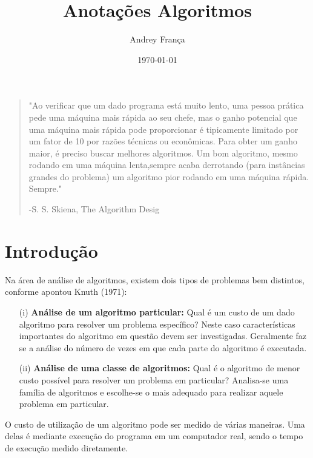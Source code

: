 \documentclass[10pt,a4paper]{article}
\author{Andrey França}
\title{Anotações Algoritmos}
\date{\today}
\begin{document}
\maketitle

\begin{quote}

	"Ao verificar que um dado programa está muito lento, uma pessoa prática pede uma 
	máquina mais rápida ao seu chefe, mas o ganho potencial que uma máquina mais 
	rápida pode proporcionar é tipicamente limitado por um fator de 10 por razões 
	técnicas ou econômicas. Para obter um ganho maior, é preciso buscar melhores 
	algoritmos. Um bom algoritmo, mesmo rodando em uma máquina lenta,sempre acaba 
	derrotando (para instâncias grandes do problema) um algoritmo pior rodando em 
	uma máquina rápida. Sempre."
	
	\begin{flushright}
		-S. S. Skiena, The Algorithm Desig
	\end{flushright}
	
\end{quote}

\section{Introdução}

Na área de análise de algoritmos, existem dois tipos de problemas bem distintos, conforme apontou Knuth (1971):

\begin{itemize}

	\item[(i)] \textbf{Análise de um algoritmo particular:} Qual é um custo de um dado algoritmo
	 para resolver um problema específico? Neste  caso características importantes do
	  algoritmo em questão devem ser investigadas.  Geralmente faz se a análise do 
	  número de vezes em que cada parte do algoritmo é executada.
	  
	 \item[(ii)] \textbf{Análise de uma classe de algoritmos:} Qual é o algoritmo de menor custo
	  possível para resolver um problema em particular? Analisa-se uma família de algoritmos
	   e escolhe-se o mais adequado para realizar aquele problema em particular.
	   
\end{itemize}


O custo de utilização de um algoritmo pode ser medido de várias maneiras. Uma delas é mediante
 execução do programa em um computador real, sendo o tempo de execução medido diretamente.
\end{document}
